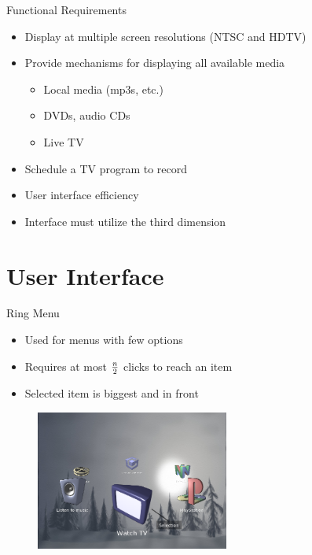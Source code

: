 \documentclass[style=smrt,mode=present,paper=screen]{powerdot}
\begin{document}
\begin{slide}{Functional Requirements}
\begin{itemize}
\item Display at multiple screen resolutions (NTSC and HDTV)
\item Provide mechanisms for displaying all available media
\begin{itemize}
	\item Local media (mp3s, etc.)
	\item DVDs, audio CDs
	\item Live TV
\end{itemize}
\item Schedule a TV program to record
\item User interface efficiency
\item Interface must utilize the third dimension
\end{itemize}
\end{slide}


\section{User Interface}

\begin{slide}{Ring Menu}
\begin{itemize}
\item Used for menus with few options
\item Requires at most $n \over 2$ clicks to reach an item
\item Selected item is biggest and in front
\end{itemize}
\begin{figure}[htb]
\includegraphics[width=2.5in]{../design/figures/ring_menu}
\end{figure}
\end{slide}
\end{document}

